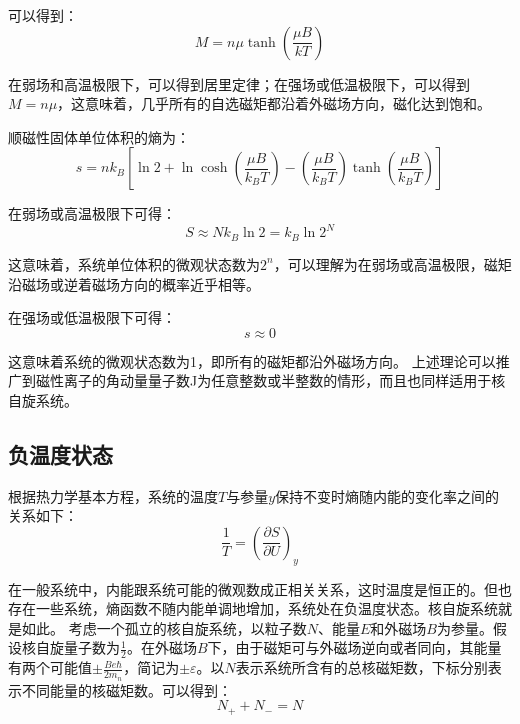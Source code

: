\documentclass[UTF8]{ctexart}
\begin{document}
\noindent 可以得到：
	\begin{equation}
		M=n \mu \tanh \left(\frac{\mu B}{k T}\right)
	\end{equation}
	
	在弱场和高温极限下，可以得到居里定律；在强场或低温极限下，可以得到$ M=n \mu $，这意味着，几乎所有的自选磁矩都沿着外磁场方向，磁化达到饱和。
	
	顺磁性固体单位体积的熵为：
	\begin{equation}
	s=n k_{B}\left[\ln 2+\ln \cosh \left(\frac{\mu B}{k_{B} T}\right)-\left(\frac{\mu B}{k_{B} T}\right) \tanh \left(\frac{\mu B}{k_{B} T}\right)\right]
	\end{equation}
	
 	在弱场或高温极限下可得：
 	\begin{equation}
	S \approx N k_{B} \ln 2=k_{B} \ln 2^{N}
	\end{equation}  

 	这意味着，系统单位体积的微观状态数为$ 2^{n} $，可以理解为在弱场或高温极限，磁矩沿磁场或逆着磁场方向的概率近乎相等。
 	
 	在强场或低温极限下可得：
 	\begin{equation}
 	s \approx 0
 	\end{equation}

这意味着系统的微观状态数为1，即所有的磁矩都沿外磁场方向。
	上述理论可以推广到磁性离子的角动量量子数J为任意整数或半整数的情形，而且也同样适用于核自旋系统。

	\subsection{负温度状态}
	根据热力学基本方程，系统的温度$ T $与参量$ y $保持不变时熵随内能的变化率之间的关系如下：
	\begin{equation}
	\frac{1}{T}=\left(\frac{\partial S}{\partial U}\right)_{y} \label{equ_T_S}
	\end{equation}

\noindent 在一般系统中，内能跟系统可能的微观数成正相关关系，这时温度是恒正的。但也存在一些系统，熵函数不随内能单调地增加，系统处在负温度状态。核自旋系统就是如此。
	考虑一个孤立的核自旋系统，以粒子数$ N $、能量$ E $和外磁场$ B $为参量。假设核自旋量子数为$ \frac{1}{2}$。在外磁场$ B $下，由于磁矩可与外磁场逆向或者同向，其能量有两个可能值$ \pm \frac{Be \hbar}{2m_{n}} $，简记为$ \pm \varepsilon $。以$ N $表示系统所含有的总核磁矩数，下标分别表示不同能量的核磁矩数。可以得到：
	\begin{equation}
	N_{+}+N_{-}=N
	\end{equation}
\end{document}
